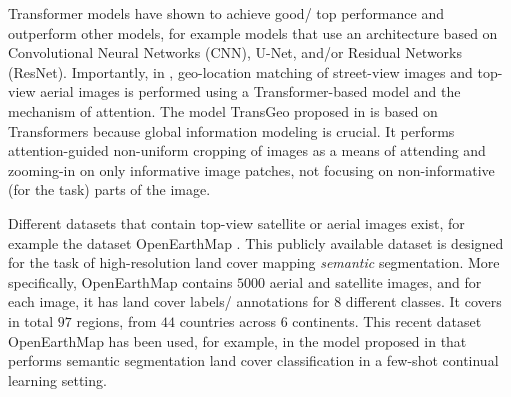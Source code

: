 Transformer
models have shown to achieve good/ top performance and outperform other 
models, for example models that use an architecture based on Convolutional Neural Networks (CNN), U-Net, and/or Residual Networks (ResNet).            
Importantly, in \cite{transf1}, geo-location matching of street-view images and top-view aerial images is performed using a Transformer-based model and the mechanism of attention. 
The model TransGeo proposed in \cite{transf1} is based on Transformers because global information modeling is crucial.    
It performs attention-guided non-uniform cropping of images as a means of attending and zooming-in on only informative image patches, not focusing on non-informative (for the task) parts of the image.    








\iffalse   
Recent \textit{Transformer}-based vision models are powerful and effective, achieving very good performance \cite{transf2}.      
For example, the model proposed in \cite{transf2} is for semantic segmentation of unlabelled data, i.e. top-view aerial images, using domain adaptation techniques, and is based on the architecture SegFormer \cite{transf3}.  
The results of the model presented in \cite{transf2} have been used for cross-view geo-location matching of street-view images and top-view aerial images in \cite{transf4}.  
The accurate matching of street- and top-view images in general is challenging \cite{transf5}. 
In this work, the new multi-modal street-view and EO dataset MyCD contains co-localized images of street-view, top-view satellite VHR, and satellite Sentinel-2 $10$m resolution, and the main aim is to accurately predict the age of buildings in cities in Europe for energy efficiency and sustainability purposes.  
For this important difficult task of automatically estimating the construction year of buildings, even in cities that are not included in the training data (i.e. previously unseen cities), as well as even when inference/ testing is performed using only the top-view modalities without the street-view image, the use of Transformer-based models is critical.
\fi

Different datasets that contain top-view satellite or aerial images exist, for example the dataset OpenEarthMap \cite{xia_2023_openearthmap}.      
This publicly available dataset is %
designed for the task of high-resolution land cover mapping \textit{semantic} segmentation.       
More specifically, OpenEarthMap contains $5000$ aerial and satellite images, and for each image, it has land cover labels/ annotations for $8$ different classes.   
It covers in total $97$ regions, from $44$ countries across $6$ continents.    
This recent dataset OpenEarthMap has been used, for example, in the model proposed in \cite{xia_2023_openearthmap2} that performs semantic segmentation land cover classification in a few-shot continual learning setting.
\fi